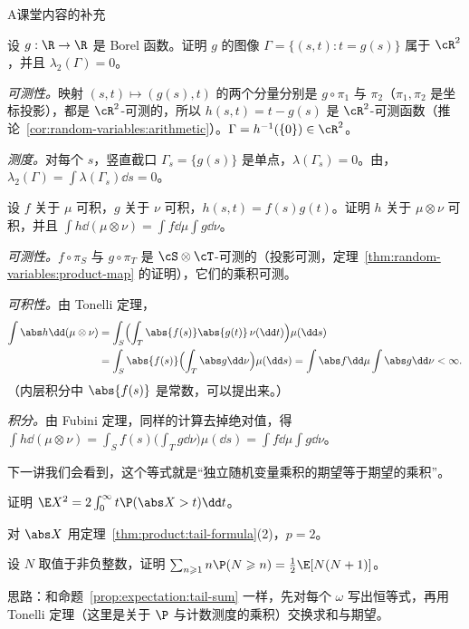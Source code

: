 \begin{exercises}{A}{课堂内容的补充}
\item\label{ex:product:A3} 设 $g:\R\to\R$ 是 Borel 函数。证明 $g$ 的图像 $\Gamma=\{(s,t):t=g(s)\}$ 属于 $\cR^2$，并且 $\lambda_2(\Gamma)=0$。
\begin{solution}
\emph{可测性。}映射 $(s,t)\mapsto(g(s),t)$ 的两个分量分别是 $g\circ\pi_1$ 与 $\pi_2$（$\pi_1,\pi_2$ 是坐标投影），都是 $\cR^2$-可测的，所以 $h(s,t)=t-g(s)$ 是 $\cR^2$-可测函数（推论~\ref{cor:random-variables:arithmetic}）。$\Gamma=h^{-1}(\{0\})\in\cR^2$。

\emph{测度。}对每个 $s$，竖直截口 $\Gamma_s=\{g(s)\}$ 是单点，$\lambda(\Gamma_s)=0$。由，$\lambda_2(\Gamma)=\int\lambda(\Gamma_s)\dd s=0$。
\end{solution}

\item\label{ex:product:A4} 设 $f$ 关于 $\mu$ 可积，$g$ 关于 $\nu$ 可积，$h(s,t)=f(s)g(t)$。证明 $h$ 关于 $\mu\otimes\nu$ 可积，并且 $\int h\dd(\mu\otimes\nu)=\int f\dd\mu\int g\dd\nu$。
\begin{solution}
\emph{可测性。}$f\circ\pi_S$ 与 $g\circ\pi_T$ 是 $\cS\otimes\cT$-可测的（投影可测，定理~\ref{thm:random-variables:product-map} 的证明），它们的乘积可测。

\emph{可积性。}由 Tonelli 定理，
\[
\begin{aligned}
\int\abs h\dd(\mu\otimes\nu)&=\int_S\Bigl(\int_T\abs{f(s)}\abs{g(t)}\,\nu(\dd t)\Bigr)\mu(\dd s)\\
&=\int_S\abs{f(s)}\Bigl(\int_T\abs g\dd\nu\Bigr)\mu(\dd s)=\int\abs f\dd\mu\int\abs g\dd\nu<\infty .
\end{aligned}
\]
（内层积分中 $\abs{f(s)}$ 是常数，可以提出来。）

\emph{积分。}由 Fubini 定理，同样的计算去掉绝对值，得 $\int h\dd(\mu\otimes\nu)=\int_Sf(s)\bigl(\int_Tg\dd\nu\bigr)\mu(\dd s)=\int f\dd\mu\int g\dd\nu$。

下一讲我们会看到，这个等式就是“独立随机变量乘积的期望等于期望的乘积”。
\end{solution}

\item\label{ex:product:A5} 
\begin{questions}
\item 证明 $\E X^2=2\int_0^\infty t\P(\abs X>t)\dd t$。
\begin{solution}
对 $\abs X$ 用定理~\ref{thm:product:tail-formula}(2)，$p=2$。
\end{solution}
\item 设 $N$ 取值于非负整数，证明 $\sum_{n\geqslant1}n\P(N\geqslant n)=\frac12\E[N(N+1)]$。
\begin{solution}
思路：和命题~\ref{prop:expectation:tail-sum} 一样，先对每个 $\omega$ 写出恒等式，再用 Tonelli 定理（这里是关于 $\P$ 与计数测度的乘积）交换求和与期望。


\end{solution}
\end{questions}
\end{exercises}

